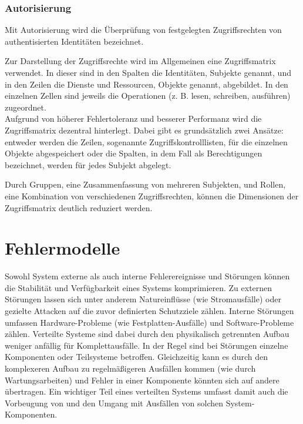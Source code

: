 \documentclass[12pt,a4paper,parskip=half]{scrreprt}
\begin{document}
\subsection{Autorisierung}

Mit Autorisierung wird die Überprüfung von festgelegten Zugriffsrechten von authentisierten Identitäten bezeichnet. 

Zur Darstellung der Zugriffsrechte wird im Allgemeinen eine Zugriffsmatrix verwendet. In dieser sind in den Spalten die Identitäten, Subjekte genannt, und in den Zeilen die Dienste und Ressourcen, Objekte genannt, abgebildet. In den einzelnen Zellen sind jeweils die Operationen (z. B. lesen, schreiben, ausführen) zugeordnet. \\
Aufgrund von höherer Fehlertoleranz und besserer Performanz wird die Zugriffsmatrix dezentral hinterlegt. Dabei gibt es grundsätzlich zwei Ansätze: entweder werden die Zeilen, sogenannte Zugriffskontrolllisten, für die einzelnen Objekte abgespeichert oder die Spalten, in dem Fall als Berechtigungen bezeichnet, werden für jedes Subjekt abgelegt.

Durch Gruppen, eine Zusammenfassung von mehreren Subjekten, und Rollen, eine Kombination von verschiedenen Zugriffsrechten, können die Dimensionen der Zugriffsmatrix deutlich reduziert werden.

\chapter{Fehlermodelle}
Sowohl System externe als auch interne Fehlerereignisse und Störungen können die Stabilität und Verfügbarkeit eines Systems komprimieren. Zu externen Störungen lassen sich unter anderem Natureinflüsse (wie Stromausfälle) oder gezielte Attacken auf die zuvor definierten Schutzziele zählen. Interne Störungen umfassen Hardware-Probleme (wie Festplatten-Ausfälle) und Software-Probleme zählen. Verteilte Systeme sind dabei durch den physikalisch getrennten Aufbau weniger anfällig für Komplettausfälle. In der Regel sind bei Störungen einzelne Komponenten oder Teilsysteme betroffen. Gleichzeitig kann es durch den komplexeren Aufbau zu regelmäßigeren Ausfällen kommen (wie durch Wartungsarbeiten) und Fehler in einer Komponente könnten sich auf andere übertragen. Ein wichtiger Teil eines verteilten Systems umfasst damit auch die Vorbeugung von und den Umgang mit Ausfällen von solchen System-Komponenten.
\end{document}
